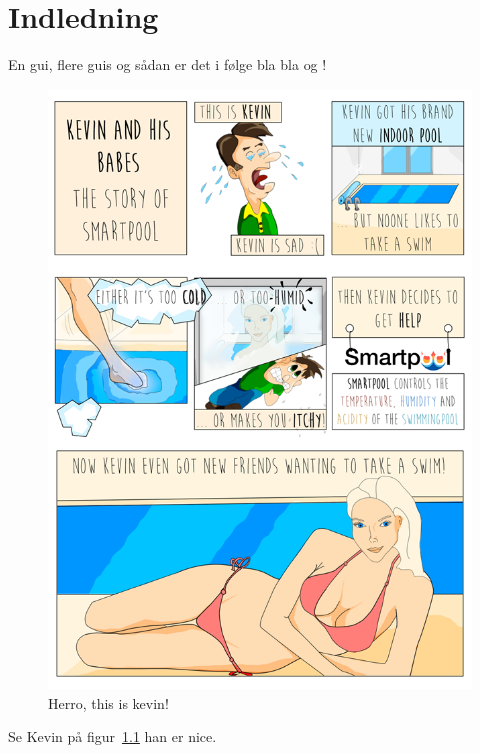 \chapter{Indledning}

En \gls{gui}, flere \glspl{gui} og sådan er det i følge bla bla \cite{Flyvbjerg2007} og \cite{refsite}!

\begin{figure}
	\centering
	\includegraphics[width=0.1\linewidth]{figs/kevin.png}
	\caption{Herro, this is kevin!}
	\label{fig:kevin}
\end{figure}

Se Kevin på figur~\ref{fig:kevin} han er nice.

\lipsum[5-10]